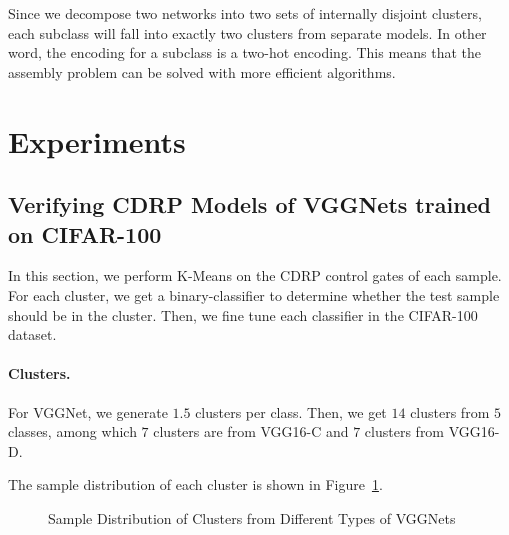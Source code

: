 \documentclass[sigplan,10pt,review]{acmart}\settopmatter{printfolios=true,printccs=false,printacmref=false}
\begin{document}
Since we decompose two networks into two sets of internally disjoint clusters, each subclass will fall into exactly two clusters from separate models.
In other word, the encoding for a subclass is a two-hot encoding.
This means that the assembly problem can be solved with more efficient algorithms.

\section{Experiments}
\label{sec:experiments}
\subsection{Verifying CDRP Models of VGGNets trained on CIFAR-100}
In this section, we perform K-Means on the CDRP control gates of each sample. For each cluster, we get a binary-classifier to determine whether the test sample should be in the cluster. Then, we fine tune each classifier in the CIFAR-100 dataset.

\paragraph{Clusters.} For VGGNet, we generate $1.5$ clusters per class.
Then, we get $14$ clusters from $5$ classes, among which $7$ clusters are from VGG16-C and $7$ clusters from VGG16-D. 

The sample distribution of each cluster is shown in Figure~\ref{fig:vgg-cluster}.

\begin{figure}[!htp]
    \centering
{}

{}
    \caption{Sample Distribution of Clusters from Different Types of VGGNets}
    \label{fig:vgg-cluster}

\end{figure}
\end{document}
